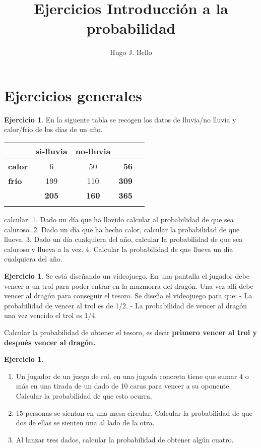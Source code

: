 \documentclass[]{article}
\title{Ejercicios Introducción a la probabilidad}
\author{Hugo J. Bello}
\date{}
\theoremstyle{plain}
\theoremstyle{definition}
\newtheorem{exercise}[theorem]{Ejercicio}
\theoremstyle{definition} %
\begin{document}
\section{Ejercicios generales}

\begin{exercise}
En la siguente tabla se recogen los datos de lluvia/no lluvia y
calor/frío de los días de un año.

\begin{longtable}[]{@{}lccrl@{}}
\toprule
& \textbf{si-lluvia} & \textbf{no-lluvia} & &\tabularnewline
\midrule
\endhead
\textbf{calor} & 6 & 50 & \textbf{56} &\tabularnewline
\textbf{frío} & 199 & 110 & \textbf{309} &\tabularnewline
& \textbf{205} & \textbf{160} & \textbf{365} &\tabularnewline
& & & &\tabularnewline
\bottomrule
\end{longtable}

calcular: 1. Dado un día que ha llovido calcular al probabilidad de que
sea caluroso. 2. Dado un día que ha hecho calor, calcular la
probabilidad de que llueva. 3. Dado un día cualquiera del año, calcular
la probabilidad de que sea caluroso y llueva a la vez. 4. Calcular la
probabilidad de que llueva un día cualquiera del año.
\end{exercise}


\begin{exercise}
Se está diseñando un videojuego. En una pantalla el jugador debe vencer
a un trol para poder entrar en la mazmorra del dragón. Una vez allí debe
vencer al dragón para conseguir el tesoro. Se diseña el videojuego para
que: - La probabilidad de vencer al trol es de 1/2. - La probabilidad de
vencer al dragón una vez vencido el trol es 1/4.

Calcular la probabilidad de obtener el tesoro, es decir \textbf{primero
vencer al trol y después vencer al dragón.}
\end{exercise}


\begin{exercise}

\begin{enumerate}
\def\labelenumi{\arabic{enumi}.}
\item
  Un jugador de un juego de rol, en una jugada concreta tiene que sumar
  4 o más en una tirada de un dado de 10 caras para vencer a su
  oponente. Calcular la probabilidad de que esto ocurra.
\item
  15 personas se sientan en una mesa circular. Calcular la probabilidad
  de que dos de ellas se sienten una al lado de la otra.
\item
  Al lanzar tres dados, calcular la probabilidad de obtener algún
  cuatro.
\end{enumerate}
\end{exercise}
\end{document}

